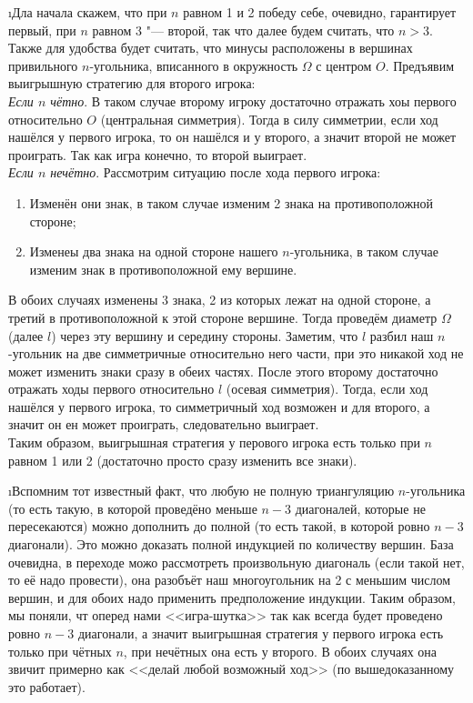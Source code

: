 \i Дла начала скажем, что при $n$ равном 1 и 2 победу себе, очевидно, гарантирует первый, при $n$ равном 3 "--- второй, так что далее будем считать, что $n > 3$. Также для удобства будет считать, что минусы расположены в вершинах привильного $n$-угольника, вписанного в окружность $\Omega$ с центром $O$. Предъявим выигрышную стратегию для второго игрока:\\
\textit{Если $n$ чётно}. В таком случае второму игроку достаточно отражать хоы первого относительно $O$ (центральная симметрия). Тогда в силу симметрии, если ход нашёлся у первого игрока, то он нашёлся и у второго, а значит второй не может проиграть. Так как игра конечно, то второй выиграет.\\
\textit{Если $n$ нечётно}. Рассмотрим ситуацию после хода первого игрока:
\begin{enumerate}
    \item Изменён они знак, в таком случае изменим 2 знака на противоположной стороне;
    \item Изменеы два знака на одной стороне нашего $n$-угольника, в таком случае изменим знак в противоположной ему вершине.
\end{enumerate}
В обоих случаях изменены 3 знака, 2 из которых лежат на одной стороне, а третий в противоположной к этой стороне вершине. Тогда проведём диаметр $\Omega$ (далее $l$) через эту вершину и середину стороны. Заметим, что $l$ разбил наш $n$-угольник на две симметричные относительно него части, при это никакой ход не может изменить знаки сразу в обеих частях. После этого второму достаточно отражать ходы первого относительно $l$ (осевая симметрия). Тогда, если ход нашёлся у первого игрока, то симметричный ход возможен и для второго, а значит он ен может проиграть, следовательно выиграет.\\
Таким образом, выигрышная стратегия у перового игрока есть только при $n$ равном 1 или 2 (достаточно просто сразу изменить все знаки).

\i Вспомним тот известный факт, что любую не полную триангуляцию $n$-угольника (то есть такую, в которой проведёно меньше $n-3$ диагоналей, которые не пересекаются) можно дополнить до полной (то есть такой, в которой ровно $n-3$ диагонали). Это можно доказать полной индукцией по количеству вершин. База очевидна, в переходе можо рассмотреть произвольную диагональ (если такой нет, то её надо провести), она разобъёт наш многоугольник на 2 с меньшим числом вершин, и для обоих надо применить предположение индукции. Таким образом, мы поняли, чт оперед нами <<игра-шутка>> так как всегда будет проведено ровно $n-3$ диагонали, а значит выигрышная стратегия у первого игрока есть только при чётных $n$, при нечётных она есть у второго. В обоих случаях она звичит примерно как <<делай любой возможный ход>> (по вышедоказанному это работает).

